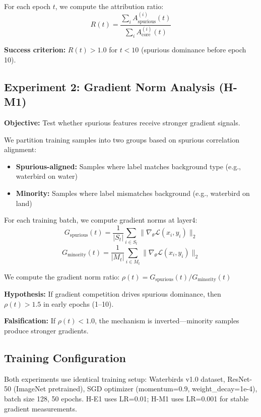 For each epoch $t$, we compute the attribution ratio:
\begin{equation}
R(t) = \frac{\sum_{i} A_{\text{spurious}}^{(i)}(t)}{\sum_{i} A_{\text{core}}^{(i)}(t)}
\end{equation}

\textbf{Success criterion:} $R(t) > 1.0$ for $t < 10$ (spurious dominance before epoch 10).

\subsection{Experiment 2: Gradient Norm Analysis (H-M1)}

\textbf{Objective:} Test whether spurious features receive stronger gradient signals.

We partition training samples into two groups based on spurious correlation alignment:
\begin{itemize}
    \item \textbf{Spurious-aligned:} Samples where label matches background type (e.g., waterbird on water)
    \item \textbf{Minority:} Samples where label mismatches background (e.g., waterbird on land)
\end{itemize}

For each training batch, we compute gradient norms at layer4:
\begin{equation}
G_{\text{spurious}}(t) = \frac{1}{|S_t|} \sum_{i \in S_t} \|\nabla_\theta \mathcal{L}(x_i, y_i)\|_2
\end{equation}
\begin{equation}
G_{\text{minority}}(t) = \frac{1}{|M_t|} \sum_{i \in M_t} \|\nabla_\theta \mathcal{L}(x_i, y_i)\|_2
\end{equation}

We compute the gradient norm ratio: $\rho(t) = G_{\text{spurious}}(t) / G_{\text{minority}}(t)$

\textbf{Hypothesis:} If gradient competition drives spurious dominance, then $\rho(t) > 1.5$ in early epochs (1--10).

\textbf{Falsification:} If $\rho(t) < 1.0$, the mechanism is inverted---minority samples produce stronger gradients.

\subsection{Training Configuration}

Both experiments use identical training setup: Waterbirds v1.0 dataset, ResNet-50 (ImageNet pretrained), SGD optimizer (momentum=0.9, weight\_decay=1e-4), batch size 128, 50 epochs. H-E1 uses LR=0.01; H-M1 uses LR=0.001 for stable gradient measurements.

